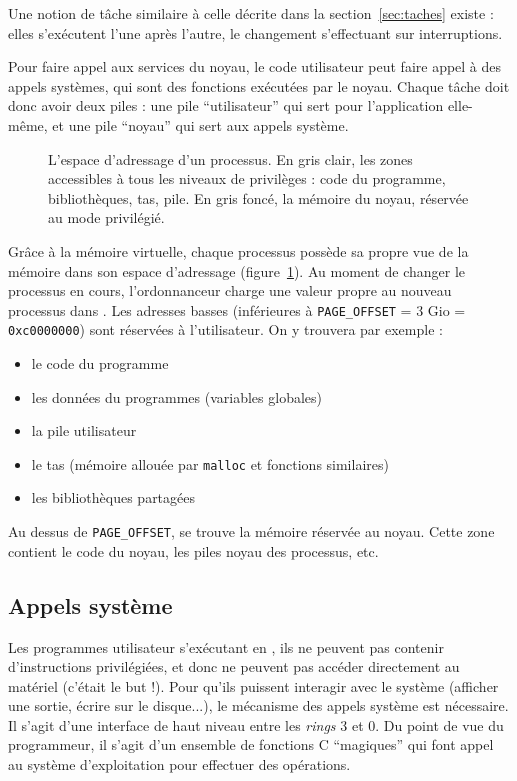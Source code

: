 Une notion de tâche similaire à celle décrite dans la section~\ref{sec:taches}
existe : elles s'exécutent l'une après l'autre, le changement s'effectuant sur
interruptions.

Pour faire appel aux services du noyau, le code utilisateur peut faire appel à
des appels systèmes, qui sont des fonctions exécutées par le noyau. Chaque tâche
doit donc avoir deux piles : une pile ``utilisateur'' qui sert pour
l'application elle-même, et une pile ``noyau'' qui sert aux appels système.

\begin{figure} %
\centering
\fbox{
  
}

\caption[Espace d'adressage d'un processus]{L'espace d'adressage d'un processus.
En gris clair, les zones accessibles à tous les niveaux de privilèges : code du
programme, bibliothèques, tas, pile. En gris foncé, la mémoire du noyau,
réservée au mode privilégié.}

\label{fig:memmap}
\end{figure}

Grâce à la mémoire virtuelle, chaque processus possède sa propre vue de la
mémoire dans son espace d'adressage (figure~\ref{fig:memmap}). Au moment de
changer le processus en cours, l'ordonnanceur charge une valeur propre au
nouveau processus dans \crtrois. Les adresses basses (inférieures à
\texttt{PAGE\_OFFSET} = 3 Gio = \texttt{0xc0000000}) sont réservées à
l'utilisateur. On y trouvera par exemple :

\begin{itemize}
\item le code du programme
\item les données du programmes (variables globales)
\item la pile utilisateur
\item le tas (mémoire allouée par \texttt{malloc} et fonctions similaires)
\item les bibliothèques partagées
\end{itemize}

Au dessus de \texttt{PAGE\_OFFSET}, se trouve la mémoire réservée au noyau.
Cette zone contient le code du noyau, les piles noyau des processus, etc.

\subsection{Appels système}

Les programmes utilisateur s'exécutant en , ils ne peuvent pas
contenir d'instructions privilégiées, et donc ne peuvent pas accéder directement
au matériel (c'était le but !). Pour qu'ils puissent interagir avec le système
(afficher une sortie, écrire sur le disque...), le mécanisme des appels système
est nécessaire. Il s'agit d'une interface de haut niveau entre les \emph{rings}
3 et 0. Du point de vue du programmeur, il s'agit d'un ensemble de fonctions C
``magiques'' qui font appel au système d'exploitation pour effectuer des
opérations.

